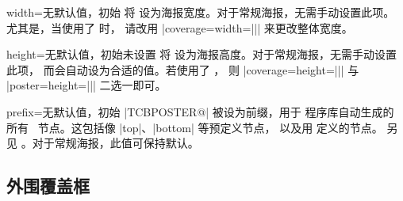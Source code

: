 \begin{posterTcbKey}[][doc new=2017-07-03]{width}{=}{无默认值，初始 }
  将  设为海报宽度。对于常规海报，无需手动设置此项。
  尤其是，当使用了  时，
  请改用 |coverage={width=||}| 来更改整体宽度。
\end{posterTcbKey}

\enlargethispage*{1cm}

\begin{posterTcbKey}[][doc new=2017-07-03]{height}{=}{无默认值，初始未设置}
  将  设为海报高度。对于常规海报，无需手动设置此项，
  而会自动设为合适的值。若使用了 ，
  则 |coverage={height=||}| 与 |poster={height=||}|
  二选一即可。
\end{posterTcbKey}


\begin{posterTcbKey}[][doc new=2017-07-03]{prefix}{=}{无默认值，初始 |TCBPOSTER@|}
   被设为前缀，用于  程序库自动生成的
  所有 \tikzname\ 节点。这包括像 |top|、|bottom| 等预定义节点，
  以及用  定义的节点。
  另见 。对于常规海报，此值可保持默认。
\end{posterTcbKey}


\subsection{外围覆盖框}\label{subsec:poster_coverage}

